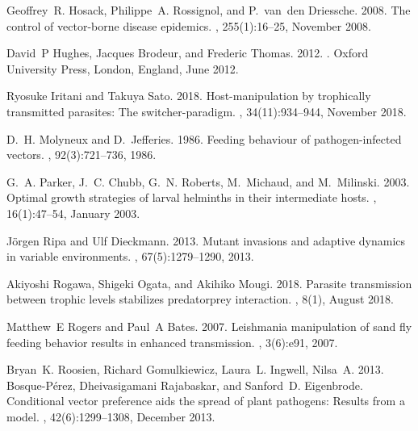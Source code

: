 \documentclass[11pt]{article}
\begin{document}
\begin{thebibliography}{24}
Geoffrey~R. Hosack, Philippe~A. Rossignol, and P.~van~den Driessche. 2008.
\newblock The control of vector-borne disease epidemics.
, 255(1):16--25, November 2008.

David~P Hughes, Jacques Brodeur, and Frederic Thomas. 2012.
.
\newblock Oxford University Press, London, England, June 2012.

Ryosuke Iritani and Takuya Sato. 2018.
\newblock Host-manipulation by trophically transmitted parasites: The
  switcher-paradigm.
, 34(11):934--944, November 2018.

D.~H. Molyneux and D.~Jefferies. 1986.
\newblock Feeding behaviour of pathogen-infected vectors.
, 92(3):721–736, 1986.

G.~A. Parker, J.~C. Chubb, G.~N. Roberts, M.~Michaud, and M.~Milinski. 2003.
\newblock Optimal growth strategies of larval helminths in their intermediate
  hosts.
, 16(1):47--54, January 2003.

Jörgen Ripa and Ulf Dieckmann. 2013.
\newblock Mutant invasions and adaptive dynamics in variable environments.
, 67(5):1279--1290, 2013.

Akiyoshi Rogawa, Shigeki Ogata, and Akihiko Mougi. 2018.
\newblock Parasite transmission between trophic levels stabilizes
  predator{\textendash}prey interaction.
, 8(1), August 2018.

Matthew~E Rogers and Paul~A Bates. 2007.
\newblock Leishmania manipulation of sand fly feeding behavior results in
  enhanced transmission.
, 3(6):e91, 2007.

Bryan~K. Roosien, Richard Gomulkiewicz, Laura~L. Ingwell, Nilsa~A. 2013.
  Bosque-P{\'{e}}rez, Dheivasigamani Rajabaskar, and Sanford~D. Eigenbrode.
\newblock Conditional vector preference aids the spread of plant pathogens:
  Results from a model.
, 42(6):1299--1308, December 2013.


\end{thebibliography}
\end{document}
